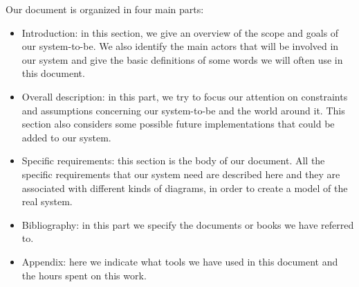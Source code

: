 Our document is organized in four main parts:
\begin{itemize}
	\item Introduction: in this section, we give an overview of the scope and goals of our system-to-be. We also identify the main actors that will be involved in our system and give the basic definitions of some words we will often use in this document.
	\item Overall description: in this part, we try to focus our attention on constraints and assumptions concerning our system-to-be and the world around it. This section also considers some possible future implementations that could be added to our system.
	\item Specific requirements: this section is the body of our document. All the specific requirements that our system need are described here and they are associated with different kinds of diagrams, in order to create a model of the real system.
	\item Bibliography: in this part we specify the documents or books we have referred to.
	\item Appendix: here we indicate what tools we have used in this document and the hours spent on this work.
\end{itemize}